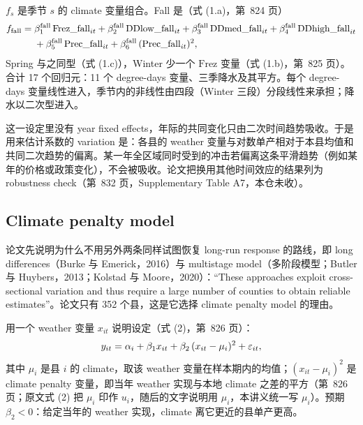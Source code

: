 $f_s$ 是季节 $s$ 的 climate 变量组合。Fall 是（式 (1.a)，第~824 页）
\begin{align}
f_{\mathrm{fall}} ={}& \beta^{\mathrm{fall}}_1\,\mathrm{Frez\_fall}_{it} + \beta^{\mathrm{fall}}_2\,\mathrm{DDlow\_fall}_{it} + \beta^{\mathrm{fall}}_3\,\mathrm{DDmed\_fall}_{it} + \beta^{\mathrm{fall}}_4\,\mathrm{DDhigh\_fall}_{it} \notag\\
&+ \beta^{\mathrm{fall}}_5\,\mathrm{Prec\_fall}_{it} + \beta^{\mathrm{fall}}_6\,(\mathrm{Prec\_fall}_{it})^2 ,
\label{eq:da-fall}
\end{align}
Spring 与之同型（式 (1.c)），Winter 少一个 $\mathrm{Frez}$ 变量（式 (1.b)，第~825 页）。合计 17 个回归元：11 个 degree-days 变量、三季降水及其平方。每个 degree-days 变量线性进入，季节内的非线性由四段（Winter 三段）分段线性来承担；降水以二次型进入。

这一设定里没有 year fixed effects，年际的共同变化只由二次时间趋势吸收。于是用来估计系数的 variation 是：各县的 weather 变量与对数单产相对于本县均值和共同二次趋势的偏离。某一年全区域同时受到的冲击若偏离这条平滑趋势（例如某年的价格或政策变化），不会被吸收。论文把换用其他时间效应的结果列为 robustness check（第~832 页，Supplementary Table A7，本仓未收）。

\subsection{Climate penalty model}

论文先说明为什么不用另外两条同样试图恢复 long-run response 的路线，即 long differences（Burke 与 Emerick，2016）与 multistage model（多阶段模型；Butler 与 Huybers，2013；Kolstad 与 Moore，2020）：``These approaches exploit cross-sectional variation and thus require a large number of counties to obtain reliable estimates''\citep[第~825 页]{da2024climate}。论文只有 352 个县，这是它选择 climate penalty model 的理由。

用一个 weather 变量 $x_{it}$ 说明设定（式 (2)，第~826 页）：
\begin{equation}
y_{it} = \alpha_i + \beta_1 x_{it} + \beta_2\,(x_{it}-\mu_i)^2 + \varepsilon_{it},
\label{eq:da-penalty}
\end{equation}
其中 $\mu_i$ 是县 $i$ 的 climate，取该 weather 变量在样本期内的均值；$(x_{it}-\mu_i)^2$ 是 climate penalty 变量，即当年 weather 实现与本地 climate 之差的平方（第~826 页；原文式 (2) 把 $\mu_i$ 印作 $u_i$，随后的文字说明用 $\mu_i$，本讲义统一写 $\mu_i$）。预期 $\beta_2<0$：给定当年的 weather 实现，climate 离它更近的县单产更高。

